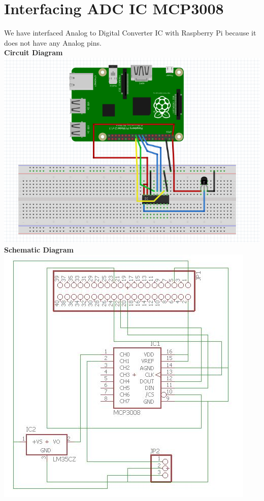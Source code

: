 \documentclass[a4paper,12pt,oneside]{book}
\begin{document}
\section{Interfacing ADC IC MCP3008}
We have interfaced Analog to Digital Converter IC with Raspberry Pi because it does not have any Analog pins.\\
\textbf{Circuit Diagram}\\
\centering 
\includegraphics[scale=0.4]{lm35_interfacing}
\flushleft
\textbf{Schematic Diagram}\\
\centering
\includegraphics[scale=0.4]{adc_schematic}
\end{document}
